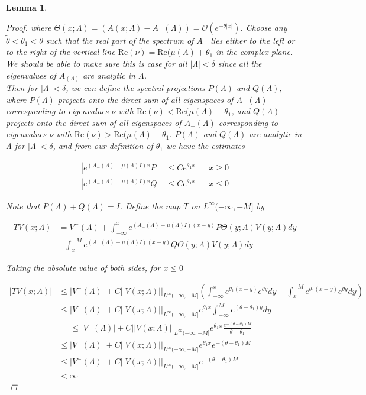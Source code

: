 \documentclass[12pt]{article}
\newtheorem{lemma}{Lemma}
\begin{document}
\begin{lemma}
\begin{proof}
where $\Theta(x; \Lambda) = (A(x; \Lambda) - A_-(\Lambda)) = \mathcal{O}(e^{-\theta|x|})$. Choose any $\tilde{\theta} < \theta_1 < \theta$ such that the real part of the spectrum of $A_-$ lies either to the left or to the right of the vertical line $\text{Re}(\nu) = \text{Re}(\mu(\Lambda) + \theta_1$ in the complex plane. We should be able to make sure this is case for all $|\Lambda| < \delta$ since all the eigenvalues of $A_(\Lambda)$ are analytic in $\Lambda$.\\

Then for $|\Lambda| < \delta$, we can define the spectral projections $P(\Lambda)$ and $Q(\Lambda)$, where $P(\Lambda)$ projects onto the direct sum of all eigenspaces of $A_-(\Lambda)$ corresponding to eigenvalues $\nu$ with $\text{Re}(\nu) < \text{Re}(\mu(\Lambda) + \theta_1$, and $Q(\Lambda)$ projects onto the direct sum of all eigenspaces of $A_-(\Lambda)$ corresponding to eigenvalues $\nu$ with $\text{Re}(\nu) > \text{Re}(\mu(\Lambda) + \theta_1$. $P(\Lambda)$ and $Q(\Lambda)$ are analytic in $\Lambda$ for $|\Lambda| < \delta$, and from our definition of $\theta_1$ we have the estimates

\begin{align*}
\left|e^{(A_-(\Lambda) - \mu(\Lambda)I)x}P \right| &\leq C e^{\theta_1 x} && x \geq 0 \\
\left|e^{(A_-(\Lambda) - \mu(\Lambda)I)x}Q \right| &\leq C e^{\theta_1 x} && x \leq 0
\end{align*}

Note that $P(\Lambda) + Q(\Lambda) = I$. Define the map $T$ on $L^\infty(-\infty, -M]$ by

\begin{align*}
TV(x; \Lambda) &= V^-(\Lambda) 
+ \int_{-\infty}^x e^{(A_-(\Lambda) - \mu(\Lambda)I)(x-y)}P\Theta(y; \Lambda) V(y; \Lambda) dy \\
&- \int_x^{-M} e^{(A_-(\Lambda) - \mu(\Lambda)I)(x-y)}Q\Theta(y; \Lambda) V(y; \Lambda) dy
\end{align*}

Taking the absolute value of both sides, for $x \leq 0$

\begin{align*}
|TV(x; \Lambda)| &\leq |V^-(\Lambda)| + C ||V(x; \Lambda)||_{L^\infty(-\infty, -M]}
\left( \int_{-\infty}^x e^{\theta_1 (x - y)} e^{\theta y} dy + \int_x^{-M} e^{\theta_1 (x - y)} e^{\theta y} dy \right) \\
&\leq |V^-(\Lambda)| + C ||V(x; \Lambda)||_{L^\infty(-\infty, -M]} e^{\theta_1 x} \int_{-\infty}^M e^{(\theta - \theta_1) y} dy \\
&= \leq |V^-(\Lambda)| + C ||V(x; \Lambda)||_{L^\infty(-\infty, -M]} e^{\theta_1 x} \frac{e^{-(\theta - \theta_1)M}}{\theta - \theta_1}\\
&\leq |V^-(\Lambda)| + C ||V(x; \Lambda)||_{L^\infty(-\infty, -M]} e^{\theta_1 x} e^{-(\theta - \theta_1)M} \\
&\leq |V^-(\Lambda)| + C ||V(x; \Lambda)||_{L^\infty(-\infty, -M]} e^{-(\theta - \theta_1)M} \\
& < \infty
\end{align*}


\end{proof}
\end{lemma}
\end{document}
